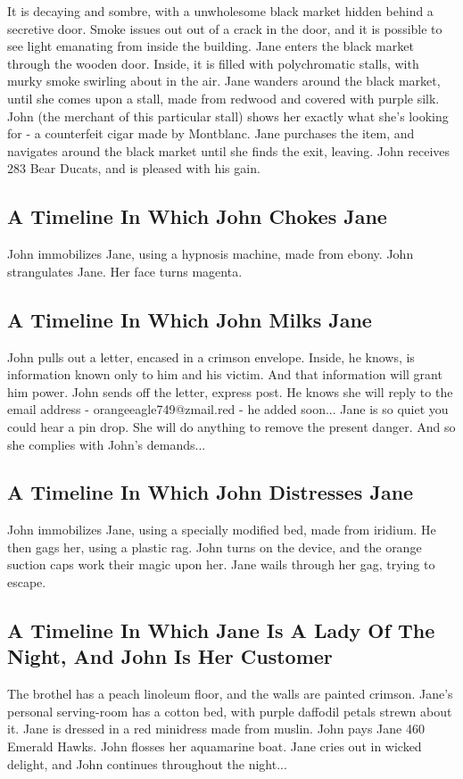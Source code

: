 \documentclass{article}
\begin{document}
It is decaying and sombre, with a unwholesome black market hidden behind a secretive door.
Smoke issues out out of a crack in the door, and it is possible to see light emanating from inside the building.
Jane enters the black market through the wooden door.
Inside, it is filled with polychromatic stalls, with murky smoke swirling about in the air.
Jane wanders around the black market, until she comes upon a stall, made from redwood and covered with purple silk.
John (the merchant of this particular stall) shows her exactly what she's looking for {-} a counterfeit cigar made by Montblanc.
Jane purchases the item, and navigates around the black market until she finds the exit, leaving.
John receives 283 Bear Ducats, and is pleased with his gain.
\subsection{A Timeline In Which John Chokes Jane}


John immobilizes Jane, using a hypnosis machine, made from ebony.
John strangulates Jane.
Her face turns magenta.
\subsection{A Timeline In Which John Milks Jane}


John pulls out a letter, encased in a crimson envelope. Inside, he knows, is information known only to him and his victim. And that information will grant him power.
John sends off the letter, express post. He knows she will reply to the email address {-} orangeeagle749@zmail.red {-} he added soon...
Jane is so quiet you could hear a pin drop. She will do anything to remove the present danger. And so she complies with John's demands...
\subsection{A Timeline In Which John Distresses Jane}


John immobilizes Jane, using a specially modified bed, made from iridium.
He then gags her, using a plastic rag.
John turns on the device, and the orange suction caps work their magic upon her.
Jane wails through her gag, trying to escape.
\subsection{A Timeline In Which Jane Is A Lady Of The Night, And John Is Her Customer}


The brothel has a peach linoleum floor, and the walls are painted crimson.
Jane's personal serving{-}room has a cotton bed, with purple daffodil petals strewn about it.
Jane is dressed in a red minidress made from muslin.
John pays Jane 460 Emerald Hawks.
John flosses her aquamarine boat.
Jane cries out in wicked delight, and John continues throughout the night...
\end{document}
